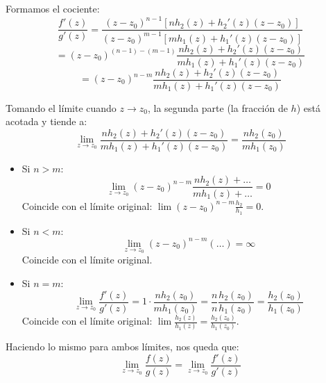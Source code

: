 {\noindent Formamos el cociente:
\[
\frac{f'(z)}{g'(z)} = \frac{(z-z_0)^{n-1} \left[ n h_2(z) + h_2'(z)(z-z_0) \right]}{(z-z_0)^{m-1} \left[ m h_1(z) + h_1'(z)(z-z_0) \right]}
\]
\[
= (z-z_0)^{(n-1)-(m-1)} \frac{n h_2(z) + h_2'(z)(z-z_0)}{m h_1(z) + h_1'(z)(z-z_0)}
\]
\[
= (z-z_0)^{n-m} \frac{n h_2(z) + h_2'(z)(z-z_0)}{m h_1(z) + h_1'(z)(z-z_0)}
\]

\noindent Tomando el límite cuando $z \to z_0$, la segunda parte (la fracción de $h$) está acotada y tiende a:
\[
\lim_{z \to z_0} \frac{n h_2(z) + h_2'(z)(z-z_0)}{m h_1(z) + h_1'(z)(z-z_0)} = \frac{n h_2(z_0)}{m h_1(z_0)}
\]



\begin{itemize}
    \item Si $n > m$:
    \[
    \lim_{z \to z_0} (z-z_0)^{n-m} \frac{n h_2(z) + \dots}{m h_1(z) + \dots} = 0
    \]
    Coincide con el límite original: $\lim (z-z_0)^{n-m} \frac{h_2}{h_1} = 0$.

    \item Si $n < m$:
    \[
    \lim_{z \to z_0} (z-z_0)^{n-m} (\dots) = \infty
    \]
    Coincide con el límite original.

    \item Si $n = m$:
    \[
    \lim_{z \to z_0} \frac{f'(z)}{g'(z)} = 1 \cdot \frac{n h_2(z_0)}{m h_1(z_0)} = \frac{n}{n} \frac{h_2(z_0)}{h_1(z_0)} = \frac{h_2(z_0)}{h_1(z_0)}
    \]
    Coincide con el límite original: $\lim \frac{h_2(z)}{h_1(z)} = \frac{h_2(z_0)}{h_1(z_0)}$.
\end{itemize}
Haciendo lo mismo para ambos límites, nos queda que:
\[
\lim_{z \to z_0} \frac{f(z)}{g(z)} = \lim_{z \to z_0} \frac{f'(z)}{g'(z)}
\]
}
